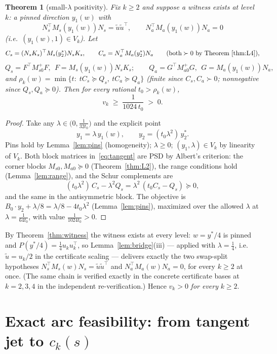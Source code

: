 \documentclass[11pt]{article}
\newtheorem{theorem}{Theorem}[section]
\newcommand{\lam}{\lambda}
\begin{document}
\begin{theorem}[small-$\lambda$ positivity]\label{thm:smalllambda}
Fix $k\ge2$ and suppose a witness exists at level $k$: a pinned direction
$y_1(w)$ with
\[
N_s^\top M_s(y_1(w))N_s=\tilde u\tilde u^\top,\qquad
N_a^\top M_a(y_1(w))N_a=0
\]
(i.e.\ $(y_1(w),1)\in V_k$). Let
\[
C_s=(N_sK_s)^\top M_s(y_2^\ast)N_sK_s,\qquad
C_a=N_a^\top M_a(y_2^\ast)N_a\qquad(\text{both}\succ0\text{ by
Theorem~\ref{thm:L4}}),
\]
\[
Q_s=F^\top M_{s0}^{+}F,\ \ F=M_s(y_1(w))N_sK_s;\qquad
Q_a=G^\top M_{a0}^{+}G,\ \ G=M_a(y_1(w))N_a,
\]
and $\rho_k(w)=\min\{t:\;tC_s\succeq Q_s,\ tC_a\succeq Q_a\}$ (finite
since $C_s,C_a\succ0$; nonnegative since $Q_s,Q_a\succeq0$). Then for
every rational $t_0>\rho_k(w)$,
\[
v_k\;\ge\;\frac1{1024\,t_0}\;>\;0 .
\]
\end{theorem}

\begin{proof}
Take any $\lam\in\bigl(0,\tfrac1{32t_0}\bigr)$ and the explicit point
\[
y_1=\lam\,y_1(w),\qquad y_2=(t_0\lam^2)\,y_2^\ast .
\]
Pins hold by Lemma~\ref{lem:pins} (homogeneity); $\lam\ge0$;
$(y_1,\lam)\in V_k$ by linearity of $V_k$. Both block matrices
in~\eqref{eq:tangent} are PSD by Albert's criterion: the corner blocks
$M_{s0},M_{a0}\succeq0$ (Theorem~\ref{thm:L2}), the range conditions hold
(Lemma~\ref{lem:range}), and the Schur complements are
\[
(t_0\lam^2)\,C_s-\lam^2Q_s=\lam^2\,(t_0C_s-Q_s)\succeq0,
\]
and the same in the antisymmetric block. The objective is
$B_0\cdot y_2+\lam/8=\lam/8-4t_0\lam^2$ (Lemma~\ref{lem:pins}), maximized
over the allowed $\lam$ at $\lam=\tfrac1{64t_0}$, with value
$\tfrac1{1024t_0}>0$.
\end{proof}

By Theorem~\ref{thm:witness} the witness exists at every level:
$w=y^\ast/4$ is pinned and $P(y^\ast/4)=\tfrac14u_ku_k^\top$, so
Lemma~\ref{lem:bridge}(iii) --- applied with $\lam=\tfrac14$, i.e.\
$\tilde u=u_k/2$ in the certificate scaling --- delivers exactly the two
swap-split hypotheses $N_s^\top M_s(w)N_s=\tilde u\tilde u^\top$ and
$N_a^\top M_a(w)N_a=0$, for every $k\ge2$ at once. (The same chain is
verified exactly in the concrete certificate bases at $k=2,3,4$ in the
independent re-verification.) Hence $v_k>0$ \emph{for every} $k\ge2$.

\section{Exact arc feasibility: from tangent jet to $c_k(s)$}
\label{sec:arc}
\end{document}
